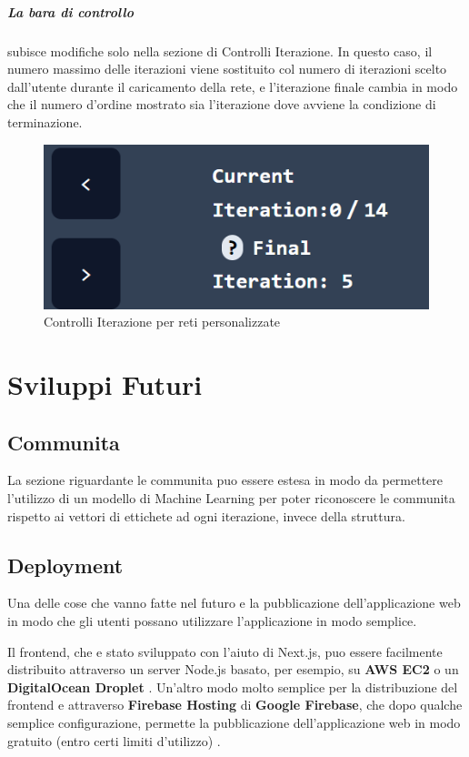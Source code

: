 \documentclass[a4paper,12pt]{report}
\begin{document}
			\paragraph*{La bara di controllo} subisce modifiche solo nella sezione di Controlli Iterazione. In questo caso, il numero massimo delle iterazioni viene sostituito col numero di iterazioni scelto dall'utente durante il caricamento della rete, e l'iterazione finale cambia in modo che il numero d'ordine mostrato sia l'iterazione dove avviene la condizione di terminazione.

			\begin{center}
				\begin{figure}[H]
				\centering
				\includegraphics[width=0.5\linewidth]{iterationcontrolcustom}
				\caption{Controlli Iterazione per reti personalizzate}
				\end{figure}
			\end{center}
\chapter{Sviluppi Futuri}

	\section{Communita}
	
	La sezione riguardante le communita puo essere estesa in modo da permettere l'utilizzo di un modello di Machine Learning per poter riconoscere le communita rispetto ai vettori di ettichete ad ogni iterazione, invece della struttura.

	\section{Deployment}

	Una delle cose che vanno fatte nel futuro e la pubblicazione dell'applicazione web in modo che gli utenti possano utilizzare l'applicazione in modo semplice.

	Il frontend, che e stato sviluppato con l'aiuto di Next.js, puo essere facilmente distribuito attraverso un server Node.js basato, per esempio, su \textbf{AWS EC2} o un \textbf{DigitalOcean Droplet} \cite{nextjsdep}. Un'altro modo molto semplice per la distribuzione del frontend e attraverso \textbf{Firebase Hosting} di \textbf{Google Firebase}, che dopo qualche semplice configurazione, permette la pubblicazione dell'applicazione web in modo gratuito (entro certi limiti d'utilizzo) \cite{firebasehosting}. 
\end{document}

